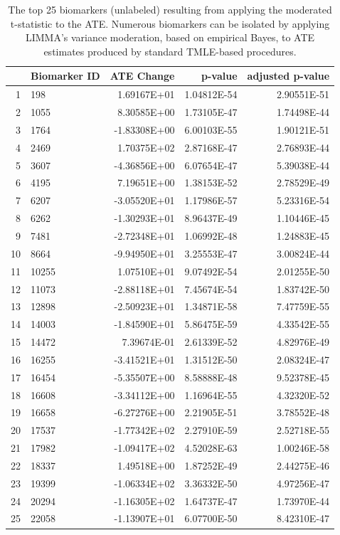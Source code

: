 \begin{table}[H]
\centering
\label{table:topresults}
\begin{tabular}{rlrrr}
  \hline
  & Biomarker ID & ATE Change & p-value & adjusted p-value \\
  \hline
  1 & 198 & 1.69167E+01 & 1.04812E-54 & 2.90551E-51 \\
  2 & 1055 & 8.30585E+00 & 1.73105E-47 & 1.74498E-44 \\
  3 & 1764 & -1.83308E+00 & 6.00103E-55 & 1.90121E-51 \\
  4 & 2469 & 1.70375E+02 & 2.87168E-47 & 2.76893E-44 \\
  5 & 3607 & -4.36856E+00 & 6.07654E-47 & 5.39038E-44 \\
  6 & 4195 & 7.19651E+00 & 1.38153E-52 & 2.78529E-49 \\
  7 & 6207 & -3.05520E+01 & 1.17986E-57 & 5.23316E-54 \\
  8 & 6262 & -1.30293E+01 & 8.96437E-49 & 1.10446E-45 \\
  9 & 7481 & -2.72348E+01 & 1.06992E-48 & 1.24883E-45 \\
  10 & 8664 & -9.94950E+01 & 3.25553E-47 & 3.00824E-44 \\
  11 & 10255 & 1.07510E+01 & 9.07492E-54 & 2.01255E-50 \\
  12 & 11073 & -2.88118E+01 & 7.45674E-54 & 1.83742E-50 \\
  13 & 12898 & -2.50923E+01 & 1.34871E-58 & 7.47759E-55 \\
  14 & 14003 & -1.84590E+01 & 5.86475E-59 & 4.33542E-55 \\
  15 & 14472 & 7.39674E-01 & 2.61339E-52 & 4.82976E-49 \\
  16 & 16255 & -3.41521E+01 & 1.31512E-50 & 2.08324E-47 \\
  17 & 16454 & -5.35507E+00 & 8.58888E-48 & 9.52378E-45 \\
  18 & 16608 & -3.34112E+00 & 1.16964E-55 & 4.32320E-52 \\
  19 & 16658 & -6.27276E+00 & 2.21905E-51 & 3.78552E-48 \\
  20 & 17537 & -1.77342E+02 & 2.27910E-59 & 2.52718E-55 \\
  21 & 17982 & -1.09417E+02 & 4.52028E-63 & 1.00246E-58 \\
  22 & 18337 & 1.49518E+00 & 1.87252E-49 & 2.44275E-46 \\
  23 & 19399 & -1.06334E+02 & 3.36332E-50 & 4.97256E-47 \\
  24 & 20294 & -1.16305E+02 & 1.64737E-47 & 1.73970E-44 \\
  25 & 22058 & -1.13907E+01 & 6.07700E-50 & 8.42310E-47 \\
  \hline
\end{tabular}
\caption{The top 25 biomarkers (unlabeled) resulting from applying the moderated
  t-statistic to the ATE. Numerous biomarkers can be isolated by applying
  LIMMA's variance moderation, based on empirical Bayes, to ATE estimates
  produced by standard TMLE-based procedures.}
\end{table}

